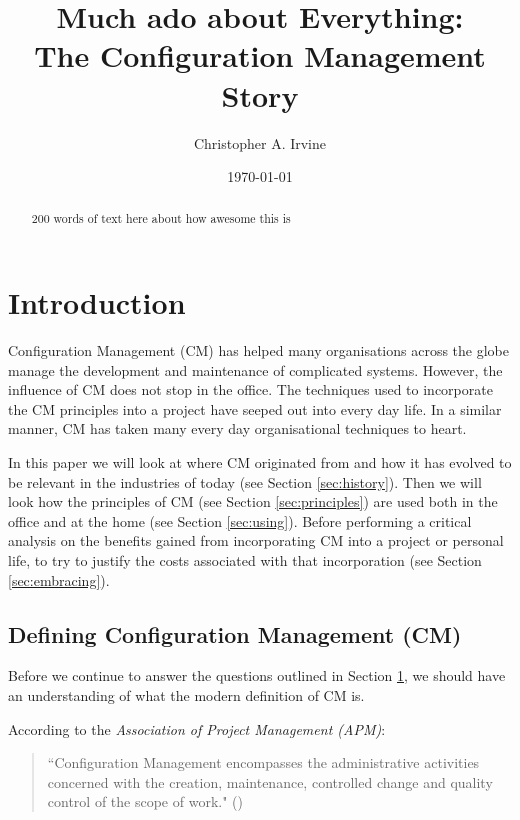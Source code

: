 \documentclass[cmpstyle]{ueacmpstyle}
\begin{document}
	\title{Much ado about Everything: \\ The Configuration Management Story}
	\author{Christopher A. Irvine}
	\date{\today}
	\maketitle
	
	\begin{abstract}
		200 words of text here about how awesome this is
	\end{abstract}

	\section{Introduction} \label{sec:intro}
	Configuration Management (CM) has helped many organisations across the globe manage the development and maintenance of complicated systems. However, the influence of CM does not stop in the office. The techniques used to incorporate the CM principles into a project have seeped out into every day life. In a similar manner, CM has taken many every day organisational techniques to heart. 
	
	In this paper we will look at where CM originated from and how it has evolved to be relevant in the industries of today (see Section \ref{sec:history}). Then we will look how the principles of CM (see Section \ref{sec:principles}) are used both in the office and at the home (see Section \ref{sec:using}). Before performing a critical analysis on the benefits gained from incorporating CM into a project or personal life, to try to justify the costs associated with that incorporation (see Section \ref{sec:embracing}). 
	
		\subsection{Defining Configuration Management (CM)} \label{sec:definition}
		Before we continue to answer the questions outlined in Section \ref{sec:intro}, we should have an understanding of what the modern definition of CM is. 
		
		According to the \emph{Association of Project Management (APM)}: 
		
		\begin{quote}
		``Configuration Management encompasses the administrative activities concerned with the creation, maintenance, controlled change and quality control of the scope of work." (\cite{apmDef})
		\end{quote}
		
\end{document}
